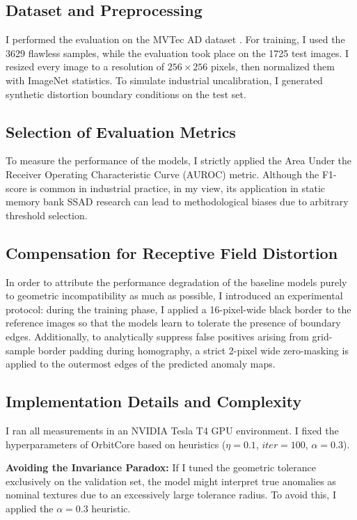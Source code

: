 \documentclass{article}
\begin{document}
	\subsection{Dataset and Preprocessing}
	I performed the evaluation on the MVTec AD dataset \cite{Bergmann2019}. For training, I used the 3629 flawless samples, while the evaluation took place on the 1725 test images. I resized every image to a resolution of $256 \times 256$ pixels, then normalized them with ImageNet statistics. To simulate industrial uncalibration, I generated synthetic distortion boundary conditions on the test set.
	
	\subsection{Selection of Evaluation Metrics}
	To measure the performance of the models, I strictly applied the Area Under the Receiver Operating Characteristic Curve (AUROC) metric. Although the F1-score is common in industrial practice, in my view, its application in static memory bank SSAD research can lead to methodological biases due to arbitrary threshold selection.
	
	\subsection{Compensation for Receptive Field Distortion}
	In order to attribute the performance degradation of the baseline models purely to geometric incompatibility as much as possible, I introduced an experimental protocol: during the training phase, I applied a 16-pixel-wide black border to the reference images so that the models learn to tolerate the presence of boundary edges. Additionally, to analytically suppress false positives arising from grid-sample border padding during homography, a strict 2-pixel wide zero-masking is applied to the outermost edges of the predicted anomaly maps.
	
	\subsection{Implementation Details and Complexity}
	I ran all measurements in an NVIDIA Tesla T4 GPU environment. I fixed the hyperparameters of OrbitCore based on heuristics ($\eta = 0.1$, $iter = 100$, $\alpha = 0.3$).
	
	\textbf{Avoiding the Invariance Paradox:} If I tuned the geometric tolerance exclusively on the validation set, the model might interpret true anomalies as nominal textures due to an excessively large tolerance radius. To avoid this, I applied the $\alpha = 0.3$ heuristic.
	
\end{document}
